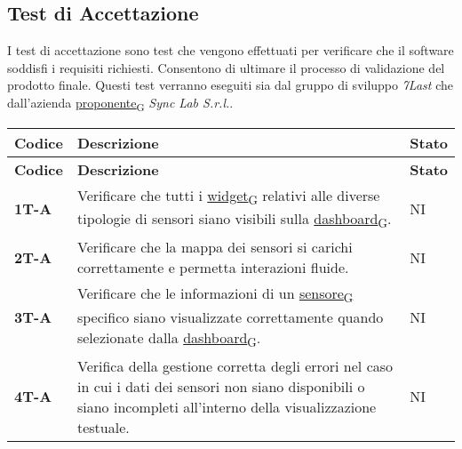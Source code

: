 \subsection{Test di Accettazione}
I test di accettazione sono test che vengono effettuati per verificare che il software soddisfi i requisiti richiesti. Consentono di ultimare il processo di validazione del prodotto finale. Questi test verranno eseguiti sia dal gruppo di sviluppo \textit{7Last} che dall'azienda \href{https://7last.github.io/docs/rtb/documentazione-interna/glossario\#proponente}{proponente\textsubscript{G}} \textit{Sync Lab S.r.l.}. \\
\begin{longtable}{|>{\raggedright\arraybackslash}m{}|>{\raggedright\arraybackslash}m{}|>{\raggedright\arraybackslash}m{}|}
	\hline
	\textbf{Codice} & \textbf{Descrizione}                                                                                                                                                  & \textbf{Stato} \\
	\hline
	\endfirsthead
	\hline
	\textbf{Codice} & \textbf{Descrizione}                                                                                                                                                  & \textbf{Stato} \\
	\endhead
	\textbf{1T-A}   & Verificare che tutti i \href{https://7last.github.io/docs/rtb/documentazione-interna/glossario\#widget}{widget\textsubscript{G}} relativi alle diverse tipologie di sensori siano visibili sulla \href{https://7last.github.io/docs/rtb/documentazione-interna/glossario\#dashboard}{dashboard\textsubscript{G}}.                                                              & NI             \\
	\hline
	\textbf{2T-A}   & Verificare che la mappa dei sensori si carichi correttamente e permetta interazioni fluide.                                                                           & NI             \\
	\hline
	\textbf{3T-A}   & Verificare che le informazioni di un \href{https://7last.github.io/docs/rtb/documentazione-interna/glossario\#sensore}{sensore\textsubscript{G}} specifico siano visualizzate correttamente quando selezionate dalla \href{https://7last.github.io/docs/rtb/documentazione-interna/glossario\#dashboard}{dashboard\textsubscript{G}}.                                           & NI             \\
	\hline
	\textbf{4T-A}   & Verifica della gestione corretta degli errori nel caso in cui i dati dei sensori non siano disponibili o siano incompleti all’interno della visualizzazione testuale. & NI             \\

\end{longtable}
